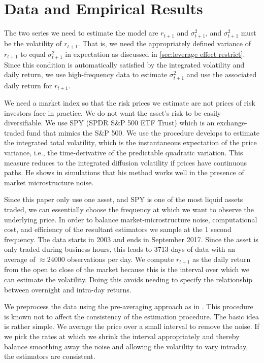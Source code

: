\documentclass[11pt, letterpaper, twoside]{article}
\begin{document}
\section{Data and Empirical Results}\label{sec:empirical}

The two series we need to estimate the model are $r_{t+1}$ and $\sigma^2_{t+1}$, and $\sigma^2_{t+1}$ must be the volatility of $r_{t+1}$. That is, we need the appropriately defined variance of $r_{t+1}$ to equal $\sigma^2_{t+1}$ in expectation as discussed in \cref{sec:leverage effect restrict}. Since this condition is automatically satisfied by the integrated volatility and daily return, we use high-frequency data to estimate $\sigma^2_{t+1}$ and use the associated daily return for $r_{t+1}$. 

We need a market index so that the risk prices we estimate are not prices of risk investors face in practice. We do not want the asset's risk to be easily diversifiable. We use SPY (SPDR S\&P 500 ETF Trust) which is an exchange-traded fund that mimics the S\&P 500.  We use the procedure \textcite{sangrey2018jumps} develops to estimate the integrated total volatility, which is the instantaneous expectation of the price variance, i.e., the time-derivative of the predictable quadratic variation. This measure reduces to the integrated diffusion volatility if prices have continuous paths. He shows in simulations that his method works well in the presence of market microstructure noise.

Since this paper only use one asset, and SPY is one of the most liquid assets traded, we can essentially choose the frequency at which we want to observe the underlying price. In order to balance market-microstructure noise, computational cost, and efficiency of the resultant estimators we sample at the \num{1} second frequency. The data starts in 2003 and ends in September 2017. Since the asset is only traded during business hours, this leads to \num{3713} days of data with an average of $\approx \num{24000}$ observations per day. We compute $r_{t+1}$ as the daily return from the open to close of the market because this is the interval over which we can estimate the volatility. Doing this avoids needing  to specify the relationship between overnight and intra-day returns. 

We preprocess the data using the pre-averaging approach as in \textcites{podolskij2009bipower, aitsahalia2012testing}. This procedure is known not to affect the consistency of the estimation procedure. The basic idea is rather simple. We average the price over a small interval to remove the noise. If we pick the rates at which we shrink the interval appropriately and thereby balance smoothing away the noise and allowing the volatility to vary intraday, the estimators are consistent.
\end{document}

